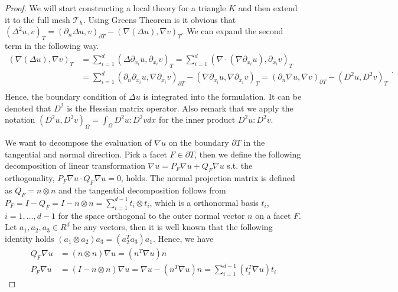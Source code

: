 \begin{proof}

 We will start constructing a local theory for a triangle $K$ and then extend it to the full mesh
$\mathcal{T}_{h} $. Using Greens Theorem is it obvious that \(
\left( \Delta ^2 u,v \right) _{T }   = \left( \partial _{n} \Delta u, v \right) _{\partial T  } - \left( \nabla \left( \Delta  u \right) , \nabla v \right) _{T }
\).
We can expand the second term in the following way.
\begin{equation*}
    \begin{split}
( \nabla ( \Delta u ) , \nabla v ) _{T } & = \sum_{i = 1}^{ d}  ( \Delta  \partial _{x_{i}} u, \partial _{x_{i}}v ) _{T }  = \sum_{i = 1}^{d}  ( \nabla \cdot ( \nabla \partial _{x_{i}} u ) , \partial _{x_{i}} v )_{T }  \\
&= \sum_{i = 1}^{d}  ( \partial_n  \partial _{x_{i}} u, \nabla  \partial _{x_{i}} v ) _{\partial T } -   ( \nabla \partial _{x_{i}} u, \nabla \partial _{x_{i}} v )_{T }
= (  \partial_n\nabla u, \nabla v ) _{\partial_{} T  } - ( D^2 u, D^2v ) _{T } \\
    \end{split}
.\end{equation*}
Hence, the boundary condition of $\Delta u$ is integrated into the formulation.  It can be denoted that $D^2$ is the Hessian matrix operator. Also remark that we apply the notation
$( D^2u, D^2v )_{\Omega } = \int_{\Omega }^{} D^{2}u : D^2v  dx$ for the inner product $D^2u:D^2v$.

We want to decompose the evaluation of $\nabla  u $ on the boundary $\partial T$ in the tangential and normal direction. Pick a facet  $F \in \partial T$, then we define the following decomposition of linear transformation $\nabla u = P_{F}\nabla u  + Q_{F}  \nabla u  $ s.t. the
orthogonality, $
P_{F} \nabla u  \cdot Q_{F}  \nabla u = 0$, holds. The normal projection matrix is defined as $Q_{F} = n \otimes n $ and the tangential decomposition follows from $ P_{F} = I - Q_{F} = I - n \otimes n  =  \sum_{i=1}^{d-1} t_{i} \otimes t_i$, which
is a orthonormal basis $t_{i}$, $i = 1, \ldots, d-1$ for the space orthogonal to the outer normal vector $n$ on a facet $F$. Let $ a_{1}, a_{2}, a_{3} \in R^{d}$ be any vectors, then it is well known that the following identity holds $ ( a_{1}
\otimes a_{2}  ) a_{3} = ( a_{2}^{T}  a_{3}) a_{1} $. Hence, we have
\begin{equation}
\label{eq:projection}
    \begin{split}
   Q_{F} \nabla u & = ( n \otimes n ) \nabla u =  (n^{T} \nabla u)n \\
   P_{F} \nabla u & =( I - n \otimes n ) \nabla u =   \nabla u  - (n^{T}  \nabla u)n =  \sum_{ i =1 }^{d-1} ( t_{i}^{T}  \nabla u ) t_{i}
    \end{split}
\end{equation}


\end{proof}
